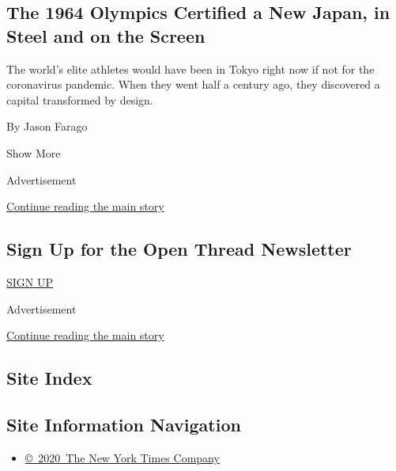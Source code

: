 \begin{enumerate}
  \hypertarget{the-1964-olympics-certified-a-new-japan-in-steel-and-on-the-screen}{%
  \subsection{The 1964 Olympics Certified a New Japan, in Steel and on
  the
  Screen}\label{the-1964-olympics-certified-a-new-japan-in-steel-and-on-the-screen}}

  The world's elite athletes would have been in Tokyo right now if not
  for the coronavirus pandemic. When they went half a century ago, they
  discovered a capital transformed by design.

  By Jason Farago
\end{enumerate}

Show More

Advertisement

\protect\hyperlink{after-mid2}{Continue reading the main story}

\hypertarget{sign-up-for-the-open-thread-newsletter}{%
\subsection{Sign Up for the Open Thread
Newsletter}\label{sign-up-for-the-open-thread-newsletter}}

\href{/newsletters/signup/TZ}{SIGN UP}

Advertisement

\protect\hyperlink{after-mktg}{Continue reading the main story}

\hypertarget{site-index}{%
\subsection{Site Index}\label{site-index}}

\hypertarget{site-information-navigation}{%
\subsection{Site Information
Navigation}\label{site-information-navigation}}

\begin{itemize}
\tightlist
\item
  \href{https://help.nytimes3xbfgragh.onion/hc/en-us/articles/115014792127-Copyright-notice}{©~2020~The
  New York Times Company}
\end{itemize}

